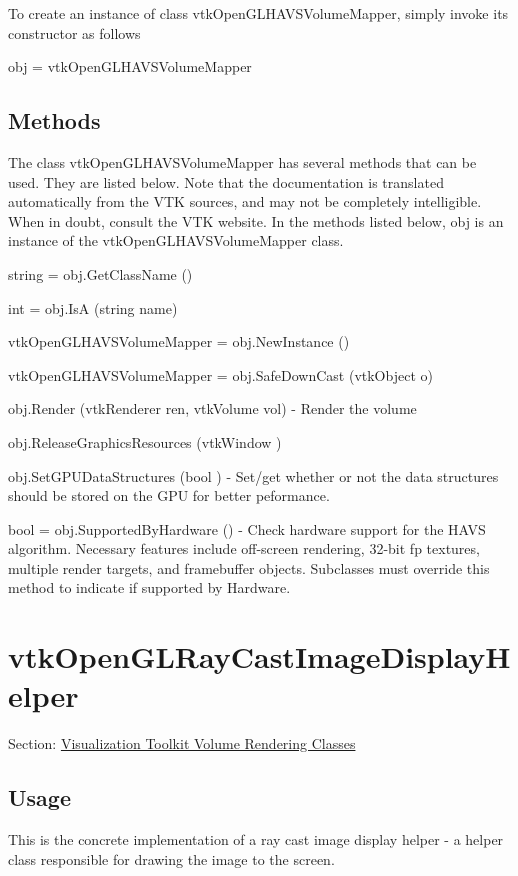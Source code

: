 To create an instance of class vtk\-Open\-G\-L\-H\-A\-V\-S\-Volume\-Mapper, simply invoke its constructor as follows \begin{DoxyVerb}  obj = vtkOpenGLHAVSVolumeMapper
\end{DoxyVerb}
 \hypertarget{vtkwidgets_vtkxyplotwidget_Methods}{}\subsection{Methods}\label{vtkwidgets_vtkxyplotwidget_Methods}
The class vtk\-Open\-G\-L\-H\-A\-V\-S\-Volume\-Mapper has several methods that can be used. They are listed below. Note that the documentation is translated automatically from the V\-T\-K sources, and may not be completely intelligible. When in doubt, consult the V\-T\-K website. In the methods listed below, {\ttfamily obj} is an instance of the vtk\-Open\-G\-L\-H\-A\-V\-S\-Volume\-Mapper class. 
\begin{DoxyItemize}
\item {\ttfamily string = obj.\-Get\-Class\-Name ()}  
\item {\ttfamily int = obj.\-Is\-A (string name)}  
\item {\ttfamily vtk\-Open\-G\-L\-H\-A\-V\-S\-Volume\-Mapper = obj.\-New\-Instance ()}  
\item {\ttfamily vtk\-Open\-G\-L\-H\-A\-V\-S\-Volume\-Mapper = obj.\-Safe\-Down\-Cast (vtk\-Object o)}  
\item {\ttfamily obj.\-Render (vtk\-Renderer ren, vtk\-Volume vol)} -\/ Render the volume  
\item {\ttfamily obj.\-Release\-Graphics\-Resources (vtk\-Window )}  
\item {\ttfamily obj.\-Set\-G\-P\-U\-Data\-Structures (bool )} -\/ Set/get whether or not the data structures should be stored on the G\-P\-U for better peformance.  
\item {\ttfamily bool = obj.\-Supported\-By\-Hardware ()} -\/ Check hardware support for the H\-A\-V\-S algorithm. Necessary features include off-\/screen rendering, 32-\/bit fp textures, multiple render targets, and framebuffer objects. Subclasses must override this method to indicate if supported by Hardware.  
\end{DoxyItemize}\hypertarget{vtkvolumerendering_vtkopenglraycastimagedisplayhelper}{}\section{vtk\-Open\-G\-L\-Ray\-Cast\-Image\-Display\-Helper}\label{vtkvolumerendering_vtkopenglraycastimagedisplayhelper}
Section\-: \hyperlink{sec_vtkvolumerendering}{Visualization Toolkit Volume Rendering Classes} \hypertarget{vtkwidgets_vtkxyplotwidget_Usage}{}\subsection{Usage}\label{vtkwidgets_vtkxyplotwidget_Usage}
This is the concrete implementation of a ray cast image display helper -\/ a helper class responsible for drawing the image to the screen.

